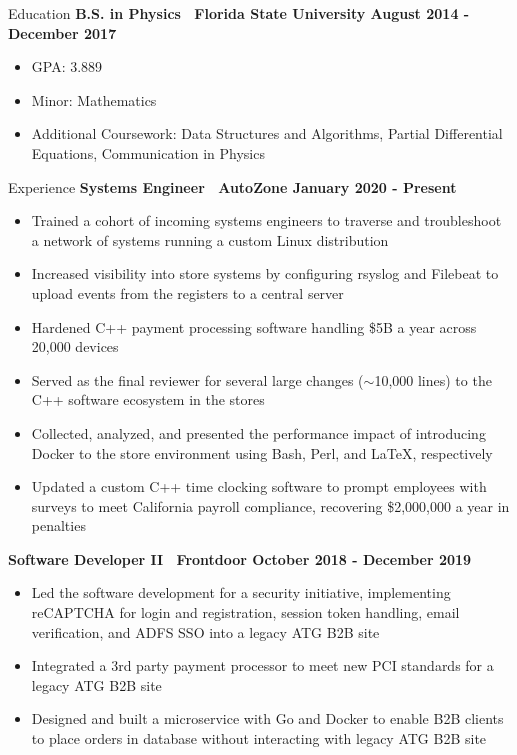 \documentclass{resume} %
\begin{document}
\begin{rSection}{Education}
    {\bf B.S. in Physics \textbar\ Florida State University \hfill August 2014 - December 2017}
    \begin{itemize}
        \item GPA: 3.889
        \item Minor: Mathematics
        \item Additional Coursework: Data Structures and Algorithms, Partial Differential Equations, Communication in Physics
    \end{itemize}
\end{rSection}

\begin{rSection}{Experience}
    {\bf Systems Engineer \textbar\ AutoZone \hfill January 2020 - Present}
    \begin{itemize}
        \item Trained a cohort of incoming systems engineers to traverse and troubleshoot a network of systems running a custom Linux distribution
        \item Increased visibility into store systems by configuring rsyslog and Filebeat to upload events from the registers to a central server
        \item Hardened C++ payment processing software handling \$5B a year across 20,000 devices
        \item Served as the final reviewer for several large changes ($\sim$10,000 lines) to the C++ software ecosystem in the stores
        \item Collected, analyzed, and presented the performance impact of introducing Docker to the store environment using Bash, Perl, and \LaTeX, respectively
        \item Updated a custom C++ time clocking software to prompt employees with surveys to meet California payroll compliance, recovering \$2,000,000 a year in penalties
    \end{itemize}

    {\bf Software Developer II \textbar\ Frontdoor \hfill October 2018 - December 2019}
    \begin{itemize}
        \item Led the software development for a security initiative, implementing reCAPTCHA for login and registration, session token handling, email verification, and ADFS SSO into a legacy ATG B2B site
        \item Integrated a 3rd party payment processor to meet new PCI standards for a legacy ATG B2B site
        \item Designed and built a microservice with Go and Docker to enable B2B clients to place orders in database without interacting with legacy ATG B2B site
    \end{itemize}
    

\end{rSection}
\end{document}
